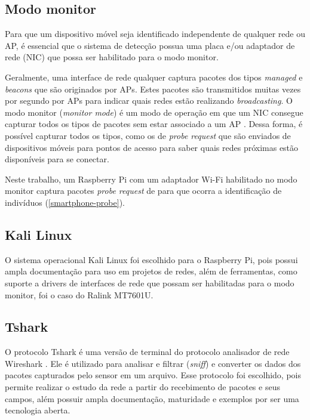 \subsection{Modo monitor}
\label{modo-monitor}

Para que um dispositivo móvel seja identificado independente de qualquer rede ou AP, é essencial que o sistema de detecção possua uma placa e/ou adaptador de rede (NIC) que possa ser habilitado para o modo monitor.

Geralmente, uma interface de rede qualquer captura pacotes dos tipos \emph{managed} e \emph{beacons} que são originados por APs. Estes pacotes são transmitidos
muitas vezes por segundo por APs para indicar quais redes estão realizando \emph{broadcasting}. O modo monitor (\emph{monitor mode}) é um modo de operação em que um NIC consegue capturar todos os tipos de pacotes sem estar associado a um AP \cite{Acrylic} \cite{Wireshark2017b}. Dessa forma, é possível capturar todos os tipos, como os de \emph{probe request} que são enviados de dispositivos móveis para pontos de acesso para saber quais redes próximas estão disponíveis para se conectar.

Neste trabalho, um Raspberry Pi com um adaptador Wi-Fi habilitado no modo monitor captura pacotes \emph{probe request} de  para que ocorra a identificação de indivíduos (\autoref{smartphone-probe}).

\subsection{Kali Linux}
O sistema operacional Kali Linux \cite{kali} foi escolhido para o Raspberry Pi, pois possui ampla documentação
para uso em projetos de redes, além de ferramentas, como suporte a drivers de interfaces de rede que possam
ser habilitadas para o modo monitor, foi o caso do Ralink MT7601U.

\subsection{Tshark}
O protocolo Tshark é uma versão de terminal do protocolo
analisador de rede Wireshark \cite{Wireshark2017} \cite{Wireshark2017a}. Ele é
utilizado para analisar e filtrar (\emph{sniff}) e converter os dados dos
pacotes capturados pelo sensor em um arquivo. Esse protocolo foi
escolhido, pois permite realizar o estudo da rede a partir do recebimento de
pacotes e seus campos, além possuir ampla documentação, maturidade e exemplos
por ser uma tecnologia aberta.

